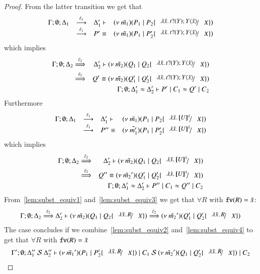 \begin{proof}
	\noi From the latter transition we get that
%
\[
		\mhorel{\Gamma}{\Delta_1}{\newsp{\tilde{m_1}}{P_1 \Par P_2 \subst{\abs{\tilde{x}}{\binp{t}{Y} \appl{Y}{\tilde{x}}}}{X}}}
		{\by{\ell_1}}{\Delta_1'}{P' \scong}{\newsp{\tilde{m_1}}{P_1 \Par P_2' \subst{\abs{\tilde{x}}{\binp{t}{Y} \appl{Y}{\tilde{x}}}}{X}}}
\]
%
	\noi which implies
%
	\begin{eqnarray}
		\Gamma; \es; \Delta_2 &\By{\ell_2}& \Delta_2' \proves \newsp{\tilde{m_2}}{Q_1 \Par Q_2 \subst{\abs{\tilde{x}}{\binp{t}{Y} \appl{Y}{\tilde{x}}}}{X}} \nonumber \\
		&\By{\ell_2}&
		Q' \scong \newsp{\tilde{m_2}}{Q_1' \Par Q_2' \subst{\abs{\tilde{x}}{\binp{t}{Y} \appl{Y}{\tilde{x}}}}{X}} \label{lem:subst_equiv1}
		\\
		&&\horel{\Gamma}{\Delta_1'}{P' \Par C_1}{\wb}{\Delta_2'}{Q' \Par C_2} \label{lem:subst_equiv2}
	\end{eqnarray}
%
	\noi Furthermore
%
\[
	\mhorel{\Gamma}{\Delta_1}{\newsp{\tilde{m_1}}{P_1 \Par P_2 \subst{\abs{\tilde{x}}{\map{U}^{\tilde{x}}}}{X}}}{\by{\ell_1}}
	{\Delta_1'}{P'' \scong}{\newsp{\tilde{m_1'}}{P_1 \Par P_2' \subst{\abs{\tilde{x}}{\map{U}^{\tilde{x}}}}{X}}}
\]
%
	\noi which implies
%
	\begin{eqnarray}
		\Gamma; \es; \Delta_2 &\By{\ell_2}& \Delta_2' \proves \newsp{\tilde{m_2}}{Q_1 \Par Q_2 \subst{\abs{\tilde{x}}{\map{U}^{\tilde{x}}}}{X}} \nonumber \\
		&\By{\ell_2}& Q'' \scong \newsp{\tilde{m_2}'}{Q_1' \Par Q_2' \subst{\abs{\tilde{x}}{\map{U}^{\tilde{x}}}}{X}} \label{lem:subst_equiv3}
		\\
		&&\horel{\Gamma}{\Delta_1'}{P'' \Par C_1}{\wb}{\Delta_2'}{Q'' \Par C_2} \label{lem:subst_equiv4}
	\end{eqnarray}
%
	\noi From~\ref{lem:subst_equiv1} and~\ref{lem:subst_equiv3} we get that $\forall R$ with $\mathtt{fv}(R) = \tilde{x}$:
%
	\begin{eqnarray*}
		\horel{\Gamma}{\Delta_2}{\newsp{\tilde{m_2}}{Q_1 \Par Q_2 \subst{\abs{\tilde{x}}{R}}{X}}}
		{\By{\ell_2}}
		{\Delta_2'}{\newsp{\tilde{m_2}'}{Q_1' \Par Q_2' \subst{\abs{\tilde{x}}{R}}{X}}}
	\end{eqnarray*}
%
	\noi The case concludes if we combine~\ref{lem:subst_equiv2} and~\ref{lem:subst_equiv4} to get that $\forall R$ with $\mathtt{fv}(R) = \tilde{x}$
%
	\begin{eqnarray*}
		\horel{\Gamma'}{\Delta_1''}{\newsp{\tilde{m_1}'}{P_1 \Par P_2' \subst{\abs{\tilde{x}}{R}}{X}} \Par C_1}
		{\ \mathcal{S}\ }
		{\Delta_2''}{\newsp{\tilde{m_2}'}{Q_1 \Par Q_2' \subst{\abs{\tilde{x}}{R}}{X}} \Par C_2}
	\end{eqnarray*}


\end{proof}
